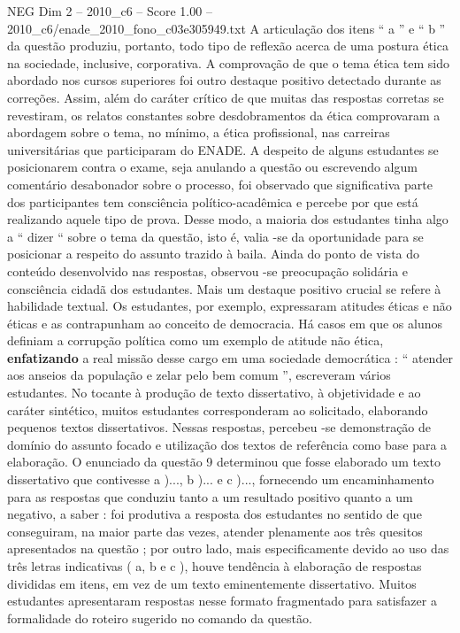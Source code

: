 \begin{textsample}{NEG Dim 2 – 2010\_c6 – Score 1.00 – 2010\_c6/enade\_2010\_fono\_c03e305949.txt}
A articulação dos itens “ a ” e “ b ” da questão produziu, portanto, todo tipo de reflexão acerca de uma postura ética na sociedade, inclusive, corporativa.
A comprovação de que o tema ética tem sido abordado nos cursos superiores foi outro destaque positivo detectado durante as correções.
Assim, além do caráter crítico de que muitas das respostas corretas se revestiram, os relatos constantes sobre desdobramentos da ética comprovaram a abordagem sobre o tema, no mínimo, a ética profissional, nas carreiras universitárias que participaram do ENADE.
A despeito de alguns estudantes se posicionarem contra o exame, seja anulando a questão ou escrevendo algum comentário desabonador sobre o processo, foi observado que significativa parte dos participantes tem consciência político-acadêmica e percebe por que está realizando aquele tipo de prova.
Desse modo, a maioria dos estudantes tinha algo a “ dizer “ sobre o tema da questão, isto é, valia -se da oportunidade para se posicionar a respeito do assunto trazido à baila.
Ainda do ponto de vista do conteúdo desenvolvido nas respostas, observou -se preocupação solidária e consciência cidadã dos estudantes.
Mais um destaque positivo crucial se refere à habilidade textual.
Os estudantes, por exemplo, expressaram atitudes éticas e não éticas e as contrapunham ao conceito de democracia.
Há casos em que os alunos definiam a corrupção política como um exemplo de atitude não ética, \textbf{enfatizando} a real missão desse cargo em uma sociedade democrática : “ atender aos anseios da população e zelar pelo bem comum ”, escreveram vários estudantes.
No tocante à produção de texto dissertativo, à objetividade e ao caráter sintético, muitos estudantes corresponderam ao solicitado, elaborando pequenos textos dissertativos.
Nessas respostas, percebeu -se demonstração de domínio do assunto focado e utilização dos textos de referência como base para a elaboração.
O enunciado da questão 9 determinou que fosse elaborado um texto dissertativo que contivesse a )..., b )... e c )..., fornecendo um encaminhamento para as respostas que conduziu tanto a um resultado positivo quanto a um negativo, a saber : foi produtiva a resposta dos estudantes no sentido de que conseguiram, na maior parte das vezes, atender plenamente aos três quesitos apresentados na questão ; por outro lado, mais especificamente devido ao uso das três letras indicativas ( a, b e c ), houve tendência à elaboração de respostas divididas em itens, em vez de um texto eminentemente dissertativo.
Muitos estudantes apresentaram respostas nesse formato fragmentado para satisfazer a formalidade do roteiro sugerido no comando da questão.

\end{textsample}
